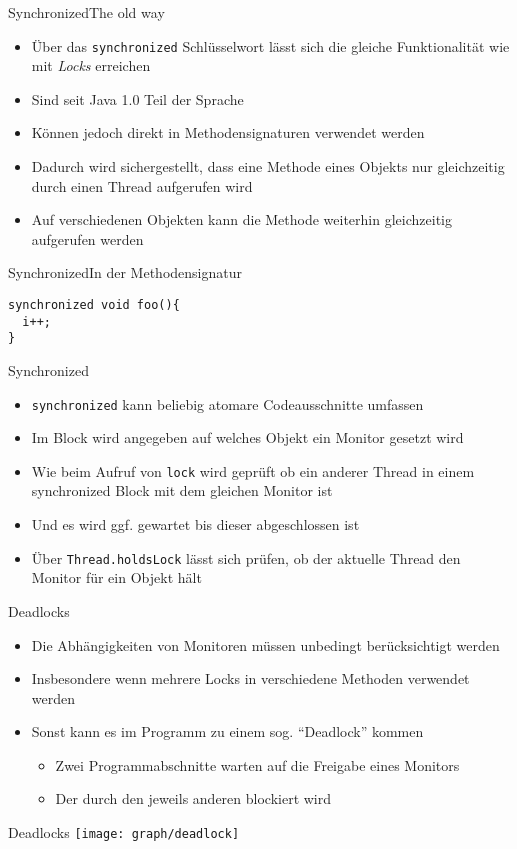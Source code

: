 \begin{frame}{Synchronized}{The old way}
    \begin{itemize}
        \item Über das \texttt{synchronized} Schlüsselwort lässt sich die gleiche Funktionalität wie mit \textit{Locks} erreichen
        \item Sind seit Java 1.0 Teil der Sprache
        \item Können jedoch direkt in Methodensignaturen verwendet werden
        \item Dadurch wird sichergestellt, dass eine Methode eines Objekts nur gleichzeitig durch einen Thread aufgerufen wird
        \item Auf verschiedenen Objekten kann die Methode weiterhin gleichzeitig aufgerufen werden
    \end{itemize}
\end{frame}

\begin{frame}[fragile]{Synchronized}{In der Methodensignatur}
\lstset{style=java}
\begin{lstlisting}
synchronized void foo(){
  i++;
}
\end{lstlisting}
\end{frame}

\begin{frame}{Synchronized}{}
    \begin{itemize}
        \item \texttt{synchronized} kann beliebig atomare Codeausschnitte umfassen
        \item Im Block wird angegeben auf welches Objekt ein Monitor gesetzt wird
        \item Wie beim Aufruf von \texttt{lock} wird geprüft ob ein anderer Thread in einem synchronized Block mit dem gleichen Monitor ist
        \item Und es wird ggf. gewartet bis dieser abgeschlossen ist
        \item Über \texttt{Thread.holdsLock} lässt sich prüfen, ob der aktuelle Thread den Monitor für ein Objekt hält
    \end{itemize}
\end{frame}

\begin{frame}{Deadlocks}{}
    \begin{itemize}
        \item Die Abhängigkeiten von Monitoren müssen unbedingt berücksichtigt werden
        \item Insbesondere wenn mehrere Locks in verschiedene Methoden verwendet werden
        \item Sonst kann es im Programm zu einem sog. "`Deadlock"' kommen
        \begin{itemize}
            \item Zwei Programmabschnitte warten auf die Freigabe eines Monitors
            \item Der durch den jeweils anderen blockiert wird
        \end{itemize}
    \end{itemize}
\end{frame}

\begin{frame}{Deadlocks}
    \texttt{[image: graph/deadlock]}
\end{frame}
